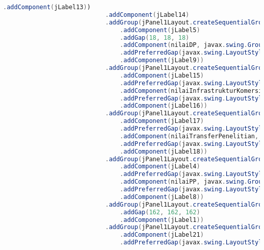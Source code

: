 \begin{lstlisting}[language=Java, caption=TampilanKondisiEksternal.java]
                                .addComponent(jLabel13))
                            .addComponent(jLabel14)
                            .addGroup(jPanel1Layout.createSequentialGroup()
                                .addComponent(jLabel5)
                                .addGap(18, 18, 18)
                                .addComponent(nilaiDP, javax.swing.GroupLayout.PREFERRED_SIZE, 48, javax.swing.GroupLayout.PREFERRED_SIZE)
                                .addPreferredGap(javax.swing.LayoutStyle.ComponentPlacement.UNRELATED)
                                .addComponent(jLabel9))
                            .addGroup(jPanel1Layout.createSequentialGroup()
                                .addComponent(jLabel15)
                                .addPreferredGap(javax.swing.LayoutStyle.ComponentPlacement.UNRELATED)
                                .addComponent(nilaiInfrastrukturKomersial, javax.swing.GroupLayout.PREFERRED_SIZE, 44, javax.swing.GroupLayout.PREFERRED_SIZE)
                                .addPreferredGap(javax.swing.LayoutStyle.ComponentPlacement.RELATED)
                                .addComponent(jLabel16))
                            .addGroup(jPanel1Layout.createSequentialGroup()
                                .addComponent(jLabel17)
                                .addPreferredGap(javax.swing.LayoutStyle.ComponentPlacement.RELATED)
                                .addComponent(nilaiTransferPenelitian, javax.swing.GroupLayout.PREFERRED_SIZE, 42, javax.swing.GroupLayout.PREFERRED_SIZE)
                                .addPreferredGap(javax.swing.LayoutStyle.ComponentPlacement.RELATED)
                                .addComponent(jLabel18))
                            .addGroup(jPanel1Layout.createSequentialGroup()
                                .addComponent(jLabel4)
                                .addPreferredGap(javax.swing.LayoutStyle.ComponentPlacement.UNRELATED)
                                .addComponent(nilaiPP, javax.swing.GroupLayout.PREFERRED_SIZE, 48, javax.swing.GroupLayout.PREFERRED_SIZE)
                                .addPreferredGap(javax.swing.LayoutStyle.ComponentPlacement.RELATED)
                                .addComponent(jLabel8))
                            .addGroup(jPanel1Layout.createSequentialGroup()
                                .addGap(162, 162, 162)
                                .addComponent(jLabel1))
                            .addGroup(jPanel1Layout.createSequentialGroup()
                                .addComponent(jLabel21)
                                .addPreferredGap(javax.swing.LayoutStyle.ComponentPlacement.RELATED)

\end{lstlisting}
